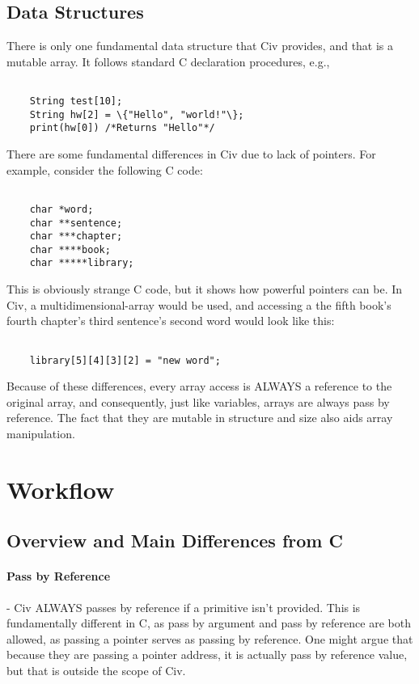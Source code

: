 \documentclass[a4paper]{article}
\begin{document}
\subsection{Data Structures}
There is only one fundamental data structure that Civ provides, and that is a mutable array. It follows standard C declaration procedures, e.g.,

{\selectfont
\begin{lstlisting}

	String test[10];
	String hw[2] = \{"Hello", "world!"\};
	print(hw[0]) /*Returns "Hello"*/
\end{lstlisting} 
} 

There are some fundamental differences in Civ due to lack of pointers. For example, consider the following C code:

{\selectfont
\begin{lstlisting}

	char *word;
	char **sentence;
	char ***chapter;
	char ****book;
	char *****library;
\end{lstlisting}
} 

This is obviously strange C code, but it shows how powerful pointers can be. In Civ, a multidimensional-array would be used, and accessing a the fifth book's fourth chapter's third sentence's second word would look like this:

{\selectfont
\begin{lstlisting}

	library[5][4][3][2] = "new word";
\end{lstlisting}
} 

Because of these differences, every array access is ALWAYS a reference to the original array, and consequently, just like variables, arrays are always pass by reference. The fact that they are mutable in structure and size also aids array manipulation.

\section{Workflow}
\subsection{Overview and Main Differences from C}

\paragraph{Pass by Reference} - Civ ALWAYS passes by reference if a primitive isn't provided. This is fundamentally different in C, as pass by argument and pass by reference are both allowed, as passing a pointer serves as passing by reference. One might argue that because they are passing a pointer address, it is actually pass by reference value, but that is outside the scope of Civ.
\end{document}
